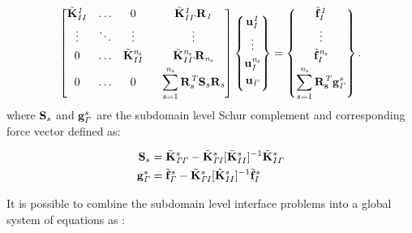 \documentclass{article}
\begin{document}
\begin{equation}\label{Eq:SchurAssembly}
{\begin{bmatrix}
     \tilde{\mathbf{K}}_{II}^{\it{1}} & \dots  &   0    \ \  &  \tilde{\mathbf{K}}_{I {\it{\Gamma}}}^{\it{1}} \mathbf{R}_{\it{1}}
\\[0.3em]
     \vdots   & \ddots & \vdots \ \  &  \vdots
\\[0.3em]
     0        & \dots  &  \tilde{\mathbf{K}}_{II}^{\it{n_s}} \ \ &  \tilde{\mathbf{K}}_{I {\it{\Gamma}}}^{\it{n_s}} \mathbf{R}_{\it{n_s}}
\\[0.3em]
   0 & \dots  &  0 \ \ & \displaystyle\sum_{s=1}^{\it{n_s}} \mathbf{R}^{\it{T}}_s \mathbf{S}_s \mathbf{R}_{\it{s}}
\end{bmatrix}}
\begin{Bmatrix}
     \bf{u}_{\it{I}}^{\it{1}}
\\[0.3em]
     \vdots
\\[0.3em]
      \bf{u}_{\it{I}}^{\it{n_s}}
\\[0.3em]
      \bf{u}_{\it{\Gamma}}
\\[0.3em]
\end{Bmatrix}  =
\begin{Bmatrix}
     \tilde{\mathbf{f}}_I^{\it{1}}
\\[0.3em]
     \vdots
\\[0.3em]
     \tilde{\mathbf{f}}_{I}^{\it{n_s}}
\\[0.3em]
     \displaystyle\sum_{s=1}^{\it{n_s}} \bf{R}^{\it{T}}_s  \mathbf{g}_{\it{\Gamma}}^{\it{s}}
\end{Bmatrix}.
\end{equation}
where $\bf{S}_{\it{s}}$ and $\bf{g}_{\it{\Gamma}}^{\it{s}}$ are the subdomain level Schur complement and corresponding force vector defined as:

\begin{align}
\mathbf{S}_s  &=  \tilde{\mathbf{K}}_{{\it\Gamma} {\it\Gamma}}^s - \tilde{\mathbf{K}}_{\it{\Gamma} I}^s [\tilde{\mathbf{K}}_{II}^{s}]^{-1} \tilde{\mathbf{K}}_{I \it{\Gamma}}^s \\
\mathbf{g}_{\it{\Gamma}}^s &= \tilde{\mathbf{f}}_{\it{\Gamma}}^s - \tilde{\mathbf{K}}_{\it{\Gamma} I}^s [\tilde{\mathbf{K}}_{II}^{s}]^{-1} \tilde{\mathbf{f}}_I^s 
\end{align}

It is possible to combine the subdomain level interface problems into a global system of equations as \cite{subber_thesis}:
\end{document}
